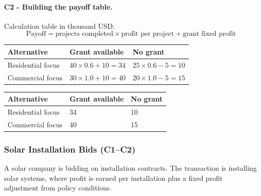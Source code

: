 
	\paragraph*{C2 - Building the payoff table.}
	\label{subsec:problem18-urban-landscaping-bids-c2}
	Calculation table in thousand USD:
	\[
	\text{Payoff}=\text{projects completed}\times\text{profit per project}+\text{grant fixed profit}
	\]
	\begin{center}
		\begin{tabular}{lll}
			\toprule
			Alternative & Grant available & No grant \\
			\midrule
			Residential focus & $40 \times 0.6 + 10 = 34$ & $25 \times 0.6 - 5 = 10$ \\
			Commercial focus & $30 \times 1.0 + 10 = 40$ & $20 \times 1.0 - 5 = 15$ \\
			\bottomrule
		\end{tabular}
	\end{center}

	\begin{center}
		\begin{tabular}{lll}
			\toprule
			Alternative & Grant available & No grant \\
			\midrule
			Residential focus & 34 & 10 \\
			Commercial focus & 40 & 15 \\
			\bottomrule
		\end{tabular}
	\end{center}


	\subsubsection{Solar Installation Bids (C1--C2)}
	\label{sec:problem19-solar-installation-bids-c1-c2}
	A solar company is bidding on installation contracts. The transaction is installing solar systems, where profit is earned per installation plus a fixed profit adjustment from policy conditions.

